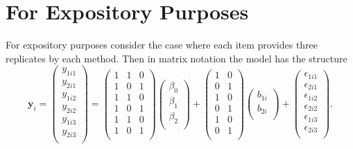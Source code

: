 \documentclass[12pt, a4paper]{report}
\theoremstyle{plain}
\theoremstyle{definition}
\theoremstyle{remark}
\begin{document}
\section{For Expository Purposes}

\bigskip

For expository purposes consider the case where each item provides three replicates by each method. Then in matrix notation the model has the structure
\[
\boldsymbol{y}_{i} =
\left(
\begin{array}{c}
y_{1i1} \\
y_{2i1} \\
y_{1i2} \\
y_{2i2} \\
y_{1i3} \\
y_{2i3} \\
\end{array}
\right) = 
\left(
\begin{array}{ccc}
1 & 1 & 0 \\
1 & 0 & 1 \\
1 & 1 & 0 \\
1 & 0 & 1 \\
1 & 1 & 0 \\
1 & 0 & 1 \\
\end{array}
\right)
\left(
\begin{array}{c}
\beta_0 \\ \beta_1 \\ \beta_2 \\
\end{array}
\right)
+
\left(
\begin{array}{cc}
1 & 0 \\
0 & 1 \\
1 & 0 \\
0 & 1 \\
1 & 0 \\
0 & 1 \\
\end{array}
\right)\left(
\begin{array}{c}
b_{1i} \\   b_{2i} \\
\end{array}
\right)
+
\left(
\begin{array}{c}
\epsilon_{1i1} \\
\epsilon_{2i1} \\
\epsilon_{1i2} \\
\epsilon_{2i2} \\
\epsilon_{1i3} \\
\epsilon_{2i3} \\
\end{array}
\right).
\]
\end{document}
